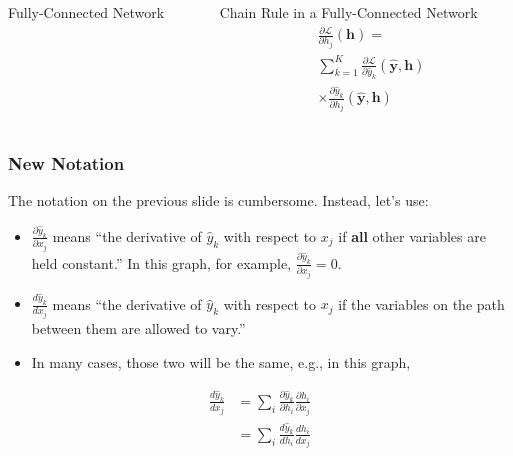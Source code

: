 \documentclass{beamer}
\begin{document}
\begin{frame}
  \begin{columns}
    \begin{column}{0.5\textwidth}
      \begin{block}{Fully-Connected Network}
        
      \end{block}
    \end{column}
    \begin{column}{0.5\textwidth}
      \begin{block}{Chain Rule in a Fully-Connected Network}
        \begin{align*}
          &\frac{\partial{\mathcal L}}{\partial h_j}(\bm{h})=\\
          &\sum_{k=1}^K\frac{\partial{\mathcal L}}{\partial\hat{y}_k}(\hat{\bm{y}},\bm{h})\\
          &\times\frac{\partial\hat{y}_k}{\partial h_j}(\hat{\bm{y}},\bm{h})
        \end{align*}
      \end{block}
    \end{column}
  \end{columns}
\end{frame}


\begin{frame}
  \frametitle{New Notation}
  The notation on the previous slide is cumbersome.  Instead, let's use:
  \begin{itemize}
  \item $\frac{\partial\hat{y}_k}{\partial x_j}$ means ``the
    derivative of $\hat{y}_k$ with respect to $x_j$ if
    \textbf{all} other variables are held constant.''  In this
    graph, for example, $\frac{\partial\hat{y}_k}{\partial x_j}=0$.
  \item $\frac{d\hat{y}_k}{dx_j}$ means ``the derivative of
    $\hat{y}_k$ with respect to $x_j$ if the variables on the
    path between them are allowed to vary.''
  \item In many cases, those two will be the same, e.g., in this graph,
  \end{itemize}
  \begin{align*}
    \frac{d\hat{y}_k}{dx_j}
    &=\sum_{i}\frac{\partial\hat{y}_k}{\partial h_i}\frac{\partial h_i}{\partial x_j}\\
    &=\sum_{i}\frac{d\hat{y}_k}{dh_i}\frac{dh_i}{dx_j}
  \end{align*}
\end{frame}
\end{document}
